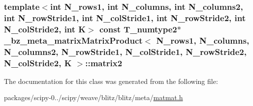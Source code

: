\subsubsection[{matrix2}]{\setlength{\rightskip}{0pt plus 5cm}template$<$int N\+\_\+rows1, int N\+\_\+columns, int N\+\_\+columns2, int N\+\_\+row\+Stride1, int N\+\_\+col\+Stride1, int N\+\_\+row\+Stride2, int N\+\_\+col\+Stride2, int K$>$ const T\+\_\+numtype2$\ast$ {\bf \+\_\+bz\+\_\+meta\+\_\+matrix\+Matrix\+Product}$<$ N\+\_\+rows1, N\+\_\+columns, N\+\_\+columns2, N\+\_\+row\+Stride1, N\+\_\+col\+Stride1, N\+\_\+row\+Stride2, N\+\_\+col\+Stride2, K $>$\+::matrix2}\label{class__bz__meta__matrixMatrixProduct_abefcbc18300a7175a21565393c0fbceb}


The documentation for this class was generated from the following file\+:\begin{DoxyCompactItemize}
\item 
packages/scipy-\/0../scipy/weave/blitz/blitz/meta/\hyperlink{matmat_8h}{matmat.\+h}\end{DoxyCompactItemize}
